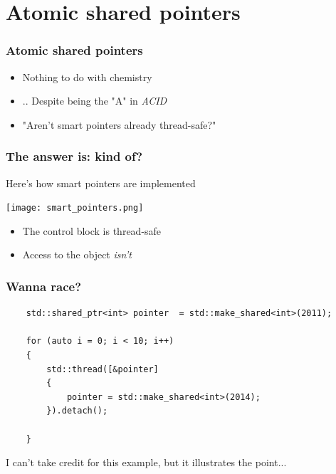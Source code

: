 \documentclass{beamer}
\begin{document}
\section{Atomic shared pointers}

\begin{frame}
\frametitle{Atomic shared pointers}

\begin{itemize}
\setlength\itemsep{2em}
\item Nothing to do with chemistry

\item .. Despite being the "A" in \textit{ACID}
\item "Aren't smart pointers already thread-safe?"

\end{itemize}
\end{frame}


\begin{frame}
\frametitle{The answer is: kind of?}
Here's how smart pointers are implemented

\vspace{1em}
\begin{center}
\texttt{[image: smart\_pointers.png]}
\end{center}
\begin{itemize}
\item The control block is thread-safe 
\item Access to the object \emph{isn't}
\end{itemize}
\end{frame}

\begin{frame}[fragile]
\frametitle{Wanna race?}

\begin{lstlisting}
    std::shared_ptr<int> pointer  = std::make_shared<int>(2011);
    
    for (auto i = 0; i < 10; i++)
    {
    	std::thread([&pointer]
    	{
    		pointer = std::make_shared<int>(2014);
    	}).detach();
    
    }
\end{lstlisting}

I can't take credit for this example, but it illustrates the point...

\end{frame}
\end{document}
